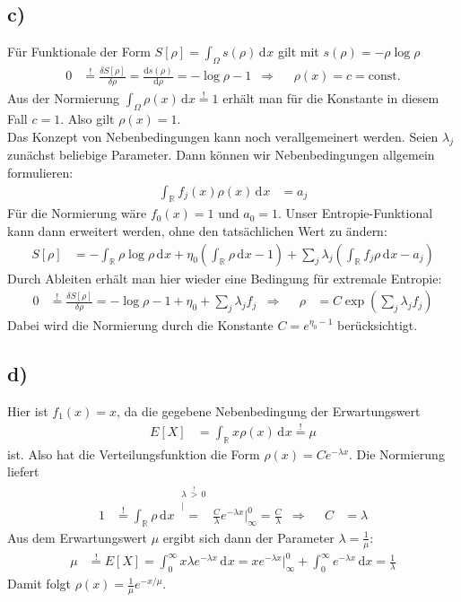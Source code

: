 \documentclass[a4paper,12pt]{article}
\newcommand{\kom}{}
\newcommand{\intx}{}
\newcommand{\intr}{}
\newcommand{\kla}{}
\newcommand{\tecxt}{}
\begin{document}
\subsection*{c)}Für Funktionale der Form $S[\rho]=\intr\int_{\Omega}{s(\rho)}\,\mathrm{d}^{ }x$ gilt mit $s(\rho)=-\rho\log\rho$
\begin{align*}
0&\overset{!}{=}\frac{\delta S[\rho]}{\delta \rho}=\frac{\tecxt\text{d}s(\rho)}{\tecxt\text{d}\rho}=-\log\rho-1&\Rightarrow &&\rho(x)=c=\tecxt\text{const.}
\end{align*}
Aus der Normierung $\int_\Omega\rho(x)\,\mathrm{d}x\overset{!}{=}1$ erhält man für die Konstante in diesem Fall $c=1$. Also gilt $\rho(x)=1$. \\
Das Konzept von Nebenbedingungen kann noch verallgemeinert werden. Seien $\lambda_j$ zunächst beliebige Parameter. Dann können wir Nebenbedingungen allgemein formulieren:
\begin{align*}
\intr\int_{\mathbb{R}^{ }}{f_j(x)\rho(x)}\,\mathrm{d}^{ }x&=a_j
\end{align*}
Für die Normierung wäre $f_0(x)=1$ und $a_0=1$. Unser Entropie-Funktional kann dann erweitert werden, ohne den tatsächlichen Wert zu ändern:
\begin{align*}
S[\rho]&=-\intr\int_{\mathbb{R}^{ }}{\rho\log\rho}\,\mathrm{d}^{ }x+\eta_0\kla\left( {\intr\int_{\mathbb{R}^{ }}{\rho}\,\mathrm{d}^{ }x-1} \right)+\sum_j\lambda_j\kla\left( {\intr\int_{\mathbb{R}^{ }}{f_j\rho}\,\mathrm{d}^{ }x-a_j} \right)
\end{align*}
Durch Ableiten erhält man hier wieder eine Bedingung für extremale Entropie:
\begin{align*}
0&\overset{!}{=}\frac{\delta S[\rho]}{\delta \rho}=-\log\rho -1+\eta_0+\sum_j\lambda_jf_j&\Rightarrow && \rho&=C\exp\kla\left( {\sum_j\lambda_jf_j} \right)
\end{align*}
Dabei wird die Normierung durch die Konstante $C=e^{\eta_0-1}$ berücksichtigt.
\subsection*{d)}Hier ist $f_1(x)=x$, da die gegebene Nebenbedingung der Erwartungswert
\begin{align*}
E[X]&=\intr\int_{\mathbb{R}^{ }}{x\rho(x)}\,\mathrm{d}^{ }x\overset{!}{=}\mu 
\end{align*}
ist. Also hat die Verteilungsfunktion die Form $\rho(x)=Ce^{-\lambda x}$. Die Normierung liefert
\begin{align*}
1&\overset{!}{=}\intr\int_{\mathbb{R}^{ }}{\rho}\,\mathrm{d}^{ }x\kom\overset{\substack{{\lambda\,\overset{!}{>}\,0} \\ |}}{=}\frac{C}{\lambda}e^{-\lambda x}\Big\vert_\infty^0=\frac{C}{\lambda}&\Rightarrow &&C&=\lambda
\end{align*}
Aus dem Erwartungswert $\mu$ ergibt sich dann der Parameter $\lambda=\frac{1}{\mu}$:
\begin{align*}
\mu&\overset{!}{=}E[X]=\intr\int_{0}^\infty{x\lambda e^{-\lambda x}}\,\mathrm{d}^{ }x=xe^{-\lambda x}\Big\vert_\infty^0+\intx\int_{0}^{\infty}e^{-\lambda x}\,\mathrm{d}x=\frac{1}{\lambda}
\end{align*}
Damit folgt $\rho(x)=\frac{1}{\mu}e^{-x/\mu}$.
\end{document}
